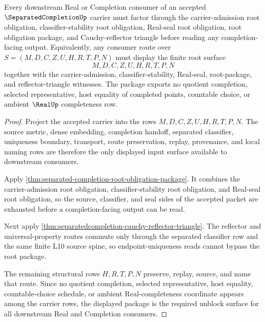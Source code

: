 \begin{theorem}
\label{thm:separatedcompletion-root-consumer-unblock-package}
Every downstream Real or Completion consumer of an accepted $\SeparatedCompletionUp$ carrier must factor through the carrier-admission root obligation, classifier-stability root obligation, Real-seal root obligation, root obligation package, and Cauchy-reflector triangle before reading any completion-facing output. Equivalently, any consumer route over $S=(M,D,C,Z,U,H,R,T,P,N)$ must display the finite root surface
$$
M,D,C,Z,U,H,R,T,P,N
$$
together with the carrier-admission, classifier-stability, Real-seal, root-package, and reflector-triangle witnesses. The package exports no quotient completion, selected representative, host equality of completed points, countable choice, or ambient $\RealUp$ completeness row.
\end{theorem}
\begin{proof}
Project the accepted carrier into the rows $M,D,C,Z,U,H,R,T,P,N$. The source metric, dense embedding, completion handoff, separated classifier, uniqueness boundary, transport, route preservation, replay, provenance, and local naming rows are therefore the only displayed input surface available to downstream consumers.

Apply \autoref{thm:separated-completion-root-obligation-package}. It combines the carrier-admission root obligation, classifier-stability root obligation, and Real-seal root obligation, so the source, classifier, and seal sides of the accepted packet are exhausted before a completion-facing output can be read.

Next apply \autoref{thm:separatedcompletion-cauchy-reflector-triangle}. The reflector and universal-property routes commute only through the separated classifier row and the same finite L10 source spine, so endpoint-uniqueness reads cannot bypass the root package.

The remaining structural rows $H,R,T,P,N$ preserve, replay, source, and name that route. Since no quotient completion, selected representative, host equality, countable-choice schedule, or ambient Real-completeness coordinate appears among the carrier rows, the displayed package is the required unblock surface for all downstream Real and Completion consumers.
\end{proof}

